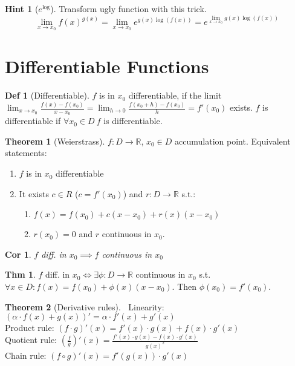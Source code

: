 \documentclass[a4paper, 10pt]{article}
\newtheorem*{corollary}{Cor}
\theoremstyle{definition}
\newtheorem*{theorem}{Thm}
\newtheorem*{definition}{Def}
\newtheorem*{note_wrapper}{Hint}
\theoremstyle{named}
\newtheorem*{ntheorem_wrapper}{Theorem}
\newenvironment{ntheorem}%
    {\begin{mdframed}[style=important]\begin{ntheorem_wrapper}}%
    {\end{ntheorem_wrapper}\end{mdframed}}
\newenvironment{note}%
    {\begin{mdframed}[style=trick]\begin{note_wrapper}}%
    {\end{note_wrapper}\end{mdframed}}
\newcommand{\R}{\mathbb{R}}
\begin{document}
\begin{note}[$e^{\log}$] Transform ugly function with this trick.
    $$\lim_{x \to x_0}f(x)^{g(x)} = \lim_{x \to x_0} e^{g(x)\log(f(x))} = e^{\lim\limits_{x \to x_0} g(x)\log(f(x))}$$
\end{note}

\section{Differentiable Functions}

\begin{definition}[Differentiable]
    $f$ is in $x_0$ differentiable, if the limit
    $\lim_{x \to x_0} \frac{f(x) - f(x_0)}{x - x_0} = \lim_{h \to 0} \frac{f(x_0 + h) - f(x_0)}{h} = f'(x_0)$ exists. $f$ is differentiable if $\forall x_0 \in D \ f$ is differentiable. 
\end{definition}

\begin{ntheorem}[Weierstrass]
    $f: D \to \R$, $x_0 \in D$ accumulation point. Equivalent statements:
    \begin{enumerate}
        \item $f$ is in $x_0$ differentiable
        \item It exists $c \in R$ ($c = f'(x_0)$) and $r: D \to \R$ s.t.:
            \begin{enumerate}
                \item $f(x) = f(x_0) + c(x - x_0) + r(x)(x - x_0)$
                \item $r(x_0) = 0$ and $r$ continuous in $x_0$.
            \end{enumerate}
    \end{enumerate}
\end{ntheorem}

\begin{corollary}
    $f$ diff. in $x_0 \implies f$ continuous in $x_0$
\end{corollary}

\begin{theorem}
    $f$ diff. in $x_0 \iff \exists \phi: D \rightarrow \R$ continuous in $x_0$ s.t. $\forall x \in D: f(x) = f(x_0) + \phi(x)(x - x_0)$. Then $\phi(x_0) = f'(x_0)$.
\end{theorem}

\begin{ntheorem}[Derivative rules]$\ $ \newline
    Linearity: $(\alpha \cdot f(x) + g(x))' = \alpha \cdot f'(x) + g'(x)$ \\
    Product rule: $(f \cdot g)'(x) = f'(x)\cdot g(x) + f(x)\cdot g'(x)$ \\
    Quotient rule: $\left(\frac{f}{g}\right)'(x) = \frac{f'(x)\cdot g(x) - f(x)\cdot g'(x)}{g(x)^2}$ \\
    Chain rule: $(f \circ g)'(x) = f'(g(x))\cdot g'(x)$
\end{ntheorem}
\end{document}
